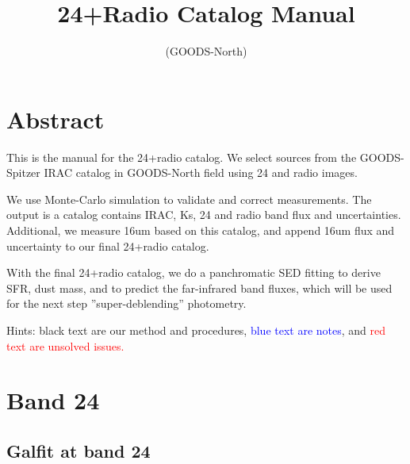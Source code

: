 \documentclass[11pt,a4paper]{article}
\author{}
\title{24+Radio Catalog Manual}
\subtitle{(GOODS-North)}
\begin{document}
\maketitle
\tableofcontents
\clearpage
\setlength{\baselineskip}{16pt}
\setlength{\parskip}{5pt}

\section{Abstract}

This is the manual for the 24+radio catalog. We select sources from the GOODS-Spitzer IRAC catalog in GOODS-North field using 24 and radio images. 

We use Monte-Carlo simulation to validate and correct measurements. The output is a catalog contains IRAC, Ks, 24 and radio band flux and uncertainties. Additional, we measure 16um based on this catalog, and append 16um flux and uncertainty to our final 24+radio catalog. 

With the final 24+radio catalog, we do a panchromatic SED fitting to derive SFR, dust mass, and to predict the far-infrared band fluxes, which will be used for the next step ''super-deblending'' photometry. 

\vspace{5cm}
Hints: black text are our method and procedures, \textcolor{blue}{blue text are notes}, and \textcolor{red}{red text are unsolved issues.}


\clearpage

\section{Band 24}

\subsection{Galfit at band 24}
\end{document}
